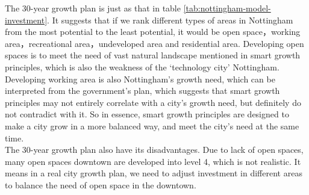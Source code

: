 The 30-year growth plan is just as that in table \ref{tab:nottingham-model-investment}. It suggests that if we rank different types of areas in Nottingham from the most potential to the least potential, it would be open space，working area，recreational area，undeveloped area and residential area. Developing open spaces is to meet the need of vast natural landscape mentioned in smart growth principles, which is also the weakness of the `technology city' Nottingham. Developing working area is also Nottingham's growth need, which can be interpreted from the government's plan, which suggests that smart growth principles may not entirely correlate with a city's growth need, but definitely do not contradict with it. So in essence, smart growth principles are designed to make a city grow in a more balanced way, and meet the city's need at the same time.\\

The 30-year growth plan also have its disadvantages. Due to lack of open spaces, many open spaces downtown are developed into level 4, which is not realistic. It means in a real city growth plan, we need to adjust investment in different areas to balance the need of open space in the downtown.

